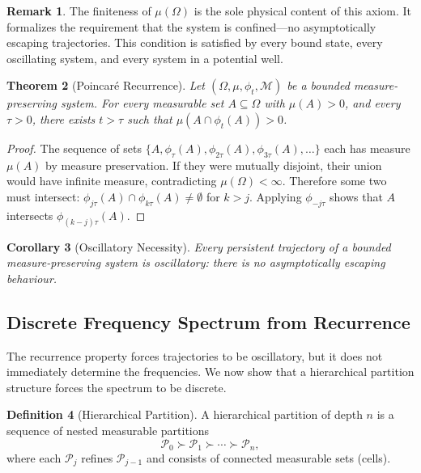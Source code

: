 \documentclass[11pt,twocolumn,a4paper]{article}
\newtheorem{theorem}{Theorem}[section]
\newtheorem{corollary}[theorem]{Corollary}
\theoremstyle{definition}
\newtheorem{definition}[theorem]{Definition}
\newtheorem{remark}[theorem]{Remark}
\newcommand{\calP}{\mathcal{P}}
\newcommand{\calM}{\mathcal{M}}
\begin{document}
\begin{remark}
The finiteness of $\mu(\Omega)$ is the sole physical content of this axiom. It formalizes the requirement that the system is confined—no asymptotically escaping trajectories. This condition is satisfied by every bound state, every oscillating system, and every system in a potential well.
\end{remark}

\begin{theorem}[Poincaré Recurrence]
\label{thm:poincare}
Let $(\Omega, \mu, \phi_t, \calM)$ be a bounded measure-preserving system. For every measurable set $A \subseteq \Omega$ with $\mu(A) > 0$, and every $\tau > 0$, there exists $t > \tau$ such that $\mu(A \cap \phi_t(A)) > 0$.
\end{theorem}

\begin{proof}
The sequence of sets $\{A, \phi_\tau(A), \phi_{2\tau}(A), \phi_{3\tau}(A), \ldots\}$ each has measure $\mu(A)$ by measure preservation. If they were mutually disjoint, their union would have infinite measure, contradicting $\mu(\Omega) < \infty$. Therefore some two must intersect: $\phi_{j\tau}(A) \cap \phi_{k\tau}(A) \neq \emptyset$ for $k > j$. Applying $\phi_{-j\tau}$ shows that $A$ intersects $\phi_{(k-j)\tau}(A)$.
\end{proof}

\begin{corollary}[Oscillatory Necessity]
\label{cor:oscillatory}
Every persistent trajectory of a bounded measure-preserving system is oscillatory: there is no asymptotically escaping behaviour.
\end{corollary}

\subsection{Discrete Frequency Spectrum from Recurrence}

The recurrence property forces trajectories to be oscillatory, but it does not immediately determine the frequencies. We now show that a hierarchical partition structure forces the spectrum to be discrete.

\begin{definition}[Hierarchical Partition]
A hierarchical partition of depth $n$ is a sequence of nested measurable partitions
\[
\calP_0 \succ \calP_1 \succ \cdots \succ \calP_n,
\]
where each $\calP_j$ refines $\calP_{j-1}$ and consists of connected measurable sets (cells).
\end{definition}
\end{document}
